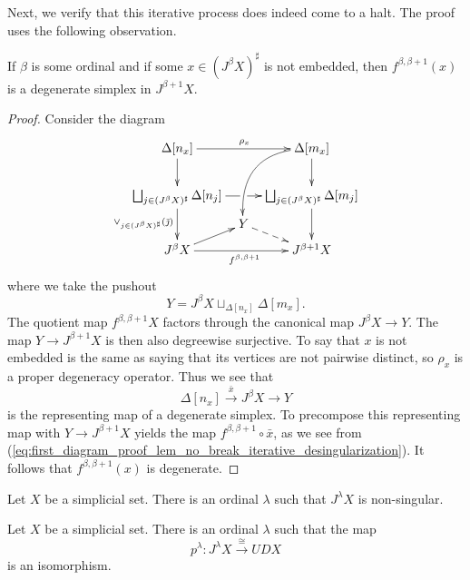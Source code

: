 Next, we verify that this iterative process does indeed come to a halt. The proof uses the following observation.
\begin{lemma}\label{lem:no_break_iterative_desingularization}
If $\beta$ is some ordinal and if some $x\in (J^\beta X)^\sharp$ is not embedded, then $f^{\beta ,\beta +1}(x)$ is a degenerate simplex in $J^{\beta +1}X$.
\end{lemma}
\begin{proof}
Consider the diagram
\begin{equation}
\label{eq:first_diagram_proof_lem_no_break_iterative_desingularization}
\begin{gathered}
\xymatrix@=0.7em{
\Delta [n_x] \ar[dd] \ar[rr]^{\rho _x} && \Delta [m_x] \ar@/_1.9pc/[lddd] \ar[dd] \\
\\
\bigsqcup _{j\in (J^\beta X)^\sharp }\Delta [n_j] \ar[dd]_{\vee _{j\in (J^\beta X)^\sharp }{(\bar{\jmath } )}} \ar@{-}[r] & \ar[r] & \bigsqcup _{j\in (J^\beta X)^\sharp }\Delta [m_j] \ar[dd] \\
& Y \ar@{-->}[dr] \\
J^\beta X \ar[ur] \ar[rr]_{f^{\beta ,\beta +1}} && J^{\beta +1}X
}
\end{gathered}
\end{equation}
where we take the pushout
\[Y=J^\beta X\sqcup _{\Delta [n_x]}\Delta [m_x].\]
The quotient map $f^{\beta ,\beta +1}X$ factors through the canonical map $J^\beta X\to Y$. The map $Y\to J^{\beta +1}X$ is then also degreewise surjective. To say that $x$ is not embedded is the same as saying that its vertices are not pairwise distinct, so $\rho _x$ is a proper degeneracy operator. Thus we see that
\[\Delta [n_x]\xrightarrow{\bar{x} } J^\beta X\to Y\]
is the representing map of a degenerate simplex. To precompose this representing map with $Y\to J^{\beta +1}X$ yields the map $f^{\beta ,\beta +1}\circ \bar{x}$, as we see from (\ref{eq:first_diagram_proof_lem_no_break_iterative_desingularization}). It follows that $f^{\beta ,\beta +1}(x)$ is degenerate.
\end{proof}
\begin{proposition}\label{prop:iterative_desingularization_halts}
Let $X$ be a simplicial set. There is an ordinal $\lambda$ such that $J^\lambda X$ is non-singular.
\end{proposition}
\begin{corollary}\label{cor:iterative_desingularization_halts}
Let $X$ be a simplicial set. There is an ordinal $\lambda$ such that the map
\[p^\lambda :J^\lambda X\xrightarrow{\cong } UDX\]
is an isomorphism.
\end{corollary}
